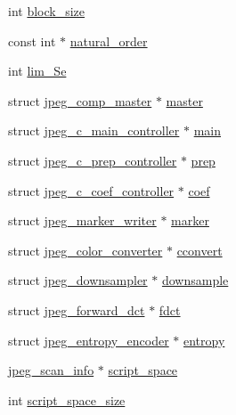 \begin{DoxyCompactItemize}
int \hyperlink{structjpeg__compress__struct_aad43e172d1ec5dd1e369b72ed8753410}{block\+\_\+size}
\item 
const int $\ast$ \hyperlink{structjpeg__compress__struct_a40fe112672c5c26f6bc53978a2b9a2a1}{natural\+\_\+order}
\item 
int \hyperlink{structjpeg__compress__struct_acb8a6365a8225a8d14d88b5d3c1d03c3}{lim\+\_\+\+Se}
\item 
struct \hyperlink{structjpeg__comp__master}{jpeg\+\_\+comp\+\_\+master} $\ast$ \hyperlink{structjpeg__compress__struct_a50b9c60f47c9fff393d7d5b3a7b3618e}{master}
\item 
struct \hyperlink{structjpeg__c__main__controller}{jpeg\+\_\+c\+\_\+main\+\_\+controller} $\ast$ \hyperlink{structjpeg__compress__struct_ab1bb86e9c2ade498b09a9a19d60e6570}{main}
\item 
struct \hyperlink{structjpeg__c__prep__controller}{jpeg\+\_\+c\+\_\+prep\+\_\+controller} $\ast$ \hyperlink{structjpeg__compress__struct_a66875fd858cd11fb7a696a717c5c7b76}{prep}
\item 
struct \hyperlink{structjpeg__c__coef__controller}{jpeg\+\_\+c\+\_\+coef\+\_\+controller} $\ast$ \hyperlink{structjpeg__compress__struct_ad54865b66c30ce332c6757d56393dedc}{coef}
\item 
struct \hyperlink{structjpeg__marker__writer}{jpeg\+\_\+marker\+\_\+writer} $\ast$ \hyperlink{structjpeg__compress__struct_a909e4ca5c3c48f380a53cc1b068eea12}{marker}
\item 
struct \hyperlink{structjpeg__color__converter}{jpeg\+\_\+color\+\_\+converter} $\ast$ \hyperlink{structjpeg__compress__struct_a7c51e665f18d6e5a0fed053c470f4914}{cconvert}
\item 
struct \hyperlink{structjpeg__downsampler}{jpeg\+\_\+downsampler} $\ast$ \hyperlink{structjpeg__compress__struct_a65a72b804640a0c339863f6562098113}{downsample}
\item 
struct \hyperlink{structjpeg__forward__dct}{jpeg\+\_\+forward\+\_\+dct} $\ast$ \hyperlink{structjpeg__compress__struct_ac113c777486860f0b2f3784345073a83}{fdct}
\item 
struct \hyperlink{structjpeg__entropy__encoder}{jpeg\+\_\+entropy\+\_\+encoder} $\ast$ \hyperlink{structjpeg__compress__struct_a30477f9e5f6be16823e1aff2762ae270}{entropy}
\item 
\hyperlink{structjpeg__scan__info}{jpeg\+\_\+scan\+\_\+info} $\ast$ \hyperlink{structjpeg__compress__struct_ab4a2c220ed2cda1b0d4c88518d02a229}{script\+\_\+space}
\item 
int \hyperlink{structjpeg__compress__struct_ae50a683b4baddef6571900ca6240b1a3}{script\+\_\+space\+\_\+size}
\end{DoxyCompactItemize}


